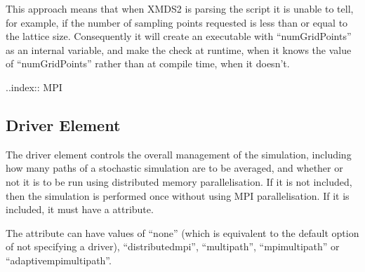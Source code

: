 \documentclass[letterpaper,10pt,english]{sphinxmanual}
\begin{document}
\sphinxAtStartPar
This approach means that when XMDS2 is parsing the script it is unable to tell, for example, if the number of sampling points requested is less than or equal to the lattice size. Consequently it will create an executable with “numGridPoints” as an internal variable, and make the check at run\sphinxhyphen{}time, when it knows the value of “numGridPoints” rather than at compile time, when it doesn’t.

\ignorespaces 
\sphinxAtStartPar
..index:: MPI


\subsection{Driver Element}
\label{\detokenize{reference_elements:driver-element}}\label{\detokenize{reference_elements:driverelement}}
\sphinxAtStartPar
The driver element controls the overall management of the simulation, including how many paths of a stochastic simulation are to be averaged, and whether or not it is to be run using distributed memory parallelisation.  If it is not included, then the simulation is performed once without using MPI parallelisation.  If it is included, it must have a  attribute.

\sphinxAtStartPar
The  attribute can have values of “none” (which is equivalent to the default option of not specifying a driver), “distributed\sphinxhyphen{}mpi”, “multi\sphinxhyphen{}path”, “mpi\sphinxhyphen{}multi\sphinxhyphen{}path” or “adaptive\sphinxhyphen{}mpi\sphinxhyphen{}multi\sphinxhyphen{}path”.
\end{document}
